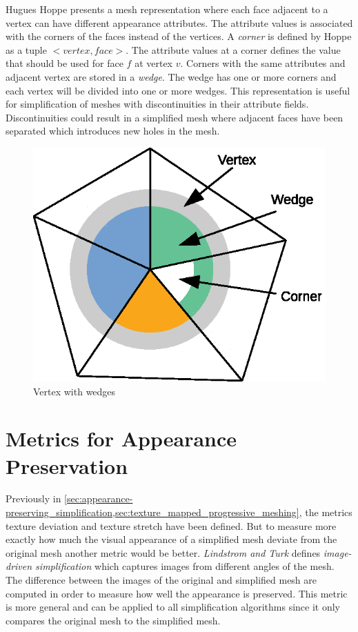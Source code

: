 Hugues Hoppe \cite{hoppe1998efficient} presents a mesh representation where each face adjacent to a vertex can have different appearance attributes. The attribute values is associated with the corners of the faces instead of the vertices. A \emph{corner} is defined by Hoppe as a tuple $<vertex,face>$. The attribute values at a corner defines the value that should be used for face $f$ at vertex $v$. Corners with the same attributes and adjacent vertex are stored in a \emph{wedge}. The wedge has one or more corners and each vertex will be divided into one or more wedges. This representation is useful for simplification of meshes with discontinuities in their attribute fields. Discontinuities could result in a simplified mesh where adjacent faces have been separated which introduces new holes in the mesh.

\begin{figure}[h]
    \centering
    \includegraphics[width=.49\textwidth]{figures/wedge.eps}
    \caption{Vertex with wedges}
    \label{fig:wedge}
\end{figure}

\section{Metrics for Appearance Preservation} \label{sec:metrics_for_appearance_preservation}
Previously in \cref{sec:appearance-preserving_simplification,sec:texture_mapped_progressive_meshing}, the metrics texture deviation and texture stretch have been defined. But to measure more exactly how much the visual appearance of a simplified mesh deviate from the original mesh another metric would be better. \emph{Lindstrom and Turk} \cite{lindstrom2000image} defines \emph{image-driven simplification} which captures images from different angles of the mesh. The difference between the images of the original and simplified mesh are computed in order to measure how well the appearance is preserved. This metric is more general and can be applied to all simplification algorithms since it only compares the original mesh to the simplified mesh.

